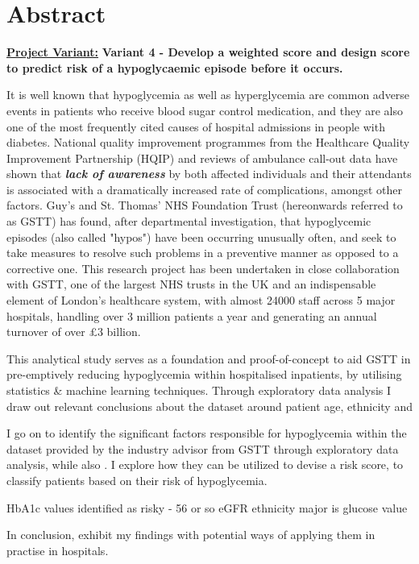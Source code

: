 
\section*{Abstract}


    \textbf{\underline{Project Variant:}} \textbf{ Variant 4 - Develop a weighted score and design score to predict risk of a hypoglycaemic episode before it occurs.} 

    \vspace{10pt}
    \par{It is well known that hypoglycemia as well as hyperglycemia are common adverse events in patients who receive blood sugar control medication, and they are also one of the most frequently cited causes of hospital admissions in people with diabetes. National quality improvement programmes from the Healthcare Quality Improvement Partnership (HQIP) and reviews of ambulance call-out data have shown that \textbf{\textit{lack of awareness}} by both affected individuals and their attendants is associated with a dramatically increased rate of complications, amongst other factors. Guy's and St. Thomas' NHS Foundation Trust (hereonwards referred to as GSTT) has found, after departmental investigation, that hypoglycemic episodes (also called "hypos") have been occurring unusually often, and seek to take measures to resolve such problems in a preventive manner as opposed to a corrective one. This research project has been undertaken in close collaboration with GSTT, one of the largest NHS trusts in the UK and an indispensable element of London's healthcare system, with almost 24000 staff across 5 major hospitals, handling over 3 million patients a year and generating an annual turnover of over \pounds3 billion.}

    \vspace{10pt}
    \par{This analytical study serves as a foundation and proof-of-concept to aid GSTT in pre-emptively reducing hypoglycemia within hospitalised inpatients, by utilising statistics \& machine learning techniques. Through exploratory data analysis I draw out relevant conclusions about the dataset around patient age, ethnicity and 
    
    I go on to identify the significant factors responsible for hypoglycemia within the dataset provided by the industry advisor from GSTT through exploratory data analysis, while also . I explore how they can be utilized to devise a risk score, to classify patients based on their risk of hypoglycemia. 
    
    HbA1c values identified as risky - 56 or so 
    eGFR 
    ethnicity
    major is glucose value 
    
 In conclusion, exhibit my findings with potential ways of applying them in practise in hospitals.}

